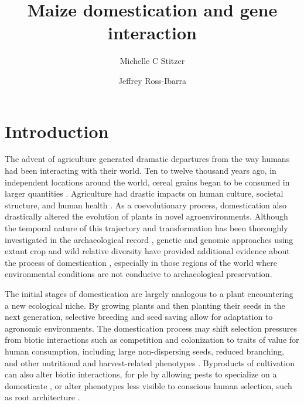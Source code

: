 \documentclass[9pt,twocolumn,twoside]{rilabRxiv}
\title{Maize domestication and gene interaction}
\author[$\ast$,1]{Michelle C Stitzer}
\author[$\ast,\dagger$]{Jeffrey Ross-Ibarra}
\affil[$\ast$]{Dept. of Plant Sciences and Center for Population Biology, University of California, Davis, CA, USA}
\affil[$\dagger$]{Genome Center, University of California, Davis, CA, USA}
\begin{document}
\maketitle




\section*{Introduction}

﻿The advent of agriculture generated dramatic departures from the way humans had been interacting with their world.
Ten to twelve thousand years ago, in independent locations around the world, cereal grains began to be consumed in larger quantities \citep{larson2014}.
Agriculture had drastic impacts on human culture, societal structure, and human health \citep{larsen2006}.
As a coevolutionary process, domestication also drastically altered the evolution of plants in novel agroenvironments.
Although the temporal nature of this trajectory and transformation has been thoroughly investigated in the archaeological record \citep{smith2001}, genetic and genomic approaches using extant crop and wild relative diversity have provided additional evidence about the process of domestication \citep{zeder2006}, especially in those regions of the world where environmental conditions are not conducive to archaeological preservation.

The initial stages of domestication are largely analogous to a plant encountering a new ecological niche.
﻿By growing plants and then planting their seeds in the next generation, selective breeding and seed saving allow for adaptation to agronomic environments.
﻿The domestication process may shift selection pressures from biotic interactions such as competition and colonization to traits of value for human consumption, including large non-dispersing seeds, reduced branching, and other nutritional and harvest-related phenotypes \citep{doebley2006}.
Byproducts of cultivation can also alter biotic interactions, for ple by allowing pests to specialize on a domesticate \citep{bernal2018, gaillard2018}, or alter phenotypes less visible to conscious human selection, such as root architecture \citep{burton2013}.
\end{document}
